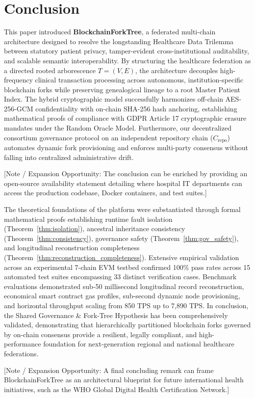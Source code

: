 \section{Conclusion}
\label{sec:conclusion}

This paper introduced \textbf{BlockchainForkTree}, a federated multi-chain architecture designed to resolve the longstanding Healthcare Data Trilemma between statutory patient privacy, tamper-evident cross-institutional auditability, and scalable semantic interoperability. By structuring the healthcare federation as a directed rooted arborescence $T = (V,E)$, the architecture decouples high-frequency clinical transaction processing across autonomous, institution-specific blockchain forks while preserving genealogical lineage to a root Master Patient Index. The hybrid cryptographic model successfully harmonizes off-chain AES-256-GCM confidentiality with on-chain SHA-256 hash anchoring, establishing mathematical proofs of compliance with GDPR Article 17 cryptographic erasure mandates under the Random Oracle Model. Furthermore, our decentralized consortium governance protocol on an independent repository chain ($C_{\text{repo}}$) automates dynamic fork provisioning and enforces multi-party consensus without falling into centralized administrative drift.

[Note / Expansion Opportunity: The conclusion can be enriched by providing an open-source availability statement detailing where hospital IT departments can access the production codebase, Docker containers, and test suites.]

The theoretical foundations of the platform were substantiated through formal mathematical proofs establishing runtime fault isolation (Theorem~\ref{thm:isolation}), ancestral inheritance consistency (Theorem~\ref{thm:consistency}), governance safety (Theorem~\ref{thm:gov_safety}), and longitudinal reconstruction completeness (Theorem~\ref{thm:reconstruction_completeness}). Extensive empirical validation across an experimental 7-chain EVM testbed confirmed 100\% pass rates across 15 automated test suites encompassing 33 distinct verification cases. Benchmark evaluations demonstrated sub-50 millisecond longitudinal record reconstruction, economical smart contract gas profiles, sub-second dynamic node provisioning, and horizontal throughput scaling from 850 TPS up to 7,890 TPS. In conclusion, the Shared Governance \& Fork-Tree Hypothesis has been comprehensively validated, demonstrating that hierarchically partitioned blockchain forks governed by on-chain consensus provide a resilient, legally compliant, and high-performance foundation for next-generation regional and national healthcare federations.

[Note / Expansion Opportunity: A final concluding remark can frame BlockchainForkTree as an architectural blueprint for future international health initiatives, such as the WHO Global Digital Health Certification Network.]
